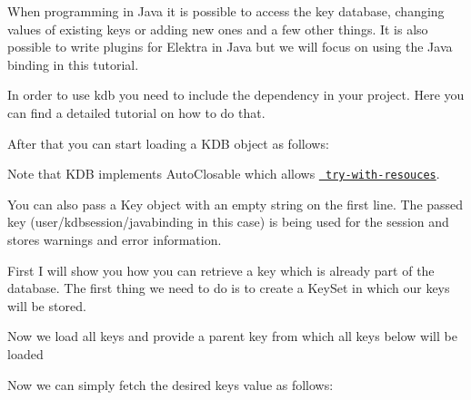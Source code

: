 When programming in Java it is possible to access the key database, changing values of existing keys or adding new ones and a few other things. It is also possible to write plugins for Elektra in Java but we will focus on using the Java binding in this tutorial.

In order to use {\ttfamily kdb} you need to include the dependency in your project. Here you can find a detailed tutorial on how to do that.

After that you can start loading a {\ttfamily K\+DB} object as follows\+:


\begin{DoxyCode}{0}
\DoxyCodeLine{    \textcolor{comment}{//Your code to manipulate keys}}
\DoxyCodeLine{\}}
\end{DoxyCode}


Note that {\ttfamily K\+DB} implements {\ttfamily Auto\+Closable} which allows \href{https://docs.oracle.com/javase/tutorial/essential/exceptions/tryResourceClose.html}{\texttt{ try-\/with-\/resouces}}.

You can also pass a {\ttfamily Key} object with an empty string on the first line. The passed key ({\ttfamily user/kdbsession/javabinding} in this case) is being used for the session and stores warnings and error information.

First I will show you how you can retrieve a key which is already part of the database. The first thing we need to do is to create a {\ttfamily Key\+Set} in which our keys will be stored.


\begin{DoxyCode}{0}
\end{DoxyCode}


Now we load all keys and provide a parent key from which all keys below will be loaded


\begin{DoxyCode}{0}
\end{DoxyCode}


Now we can simply fetch the desired key\textquotesingle{}s value as follows\+:


